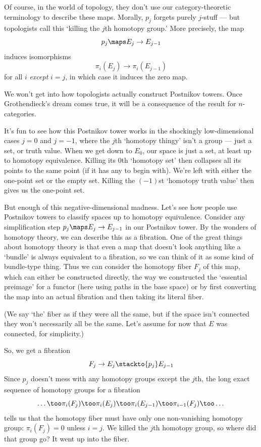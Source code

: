 \documentclass[12pt]{amsart}
\begin{document}
Of course, in the world of topology, they don't use our category-theoretic 
terminology to describe these maps.  Morally, $p_j$
forgets purely $j$-stuff --- but topologists call this `killing the
$j$th homotopy group.'  More precisely, the map
\[p_j \maps E_j \to E_{j-1}\]
induces isomorphisms
\[\pi_i(E_j)\to \pi_i(E_{j-1})\]
for all $i$ \emph{except} $i=j$, in which case it induces the zero map.

We won't get into how topologists actually
construct Postnikov towers.  Once Grothendieck's dream
comes true, it will be a consequence of the result for 
$n$-categories.

It's fun to see how this Postnikov tower works in the shockingly 
low-dimensional cases $j = 0$ and $j = -1$, where the $j$th 
`homotopy thingy' isn't a group --- just a set, or truth value.  
When we get down to $E_0$, our space is just a set, at least
up to homotopy equivalence.  Killing its $0$th `homotopy set' then 
collapses all its points to the same point (if it has any to begin with).  
We're left with either the one-point set or the empty set.
Killing the $(-1)$st `homotopy truth value' then gives us the
one-point set.

But enough of this negative-dimensional madness.  Let's see how
people use Postnikov towers to classify spaces up to homotopy
equivalence.  Consider any simplification step $p_j\maps E_j\to E_{j-1}$ 
in our Postnikov tower.  By
the wonders of homotopy theory, we can describe this as a fibration.
One of the great things about homotopy theory is that even a map
that doesn't look anything like a `bundle' is always 
equivalent to a fibration, so we can think of it as some kind of
bundle-type thing.  Thus we can consider the homotopy fiber
$F_j$ of this map, which can either be constructed directly, the way
we constructed the `essential preimage' for a functor (here using
paths in the base space) or by first converting the map into an actual
fibration and then taking its literal fiber.

(We say `the' fiber as if they were all the same, but if the space
isn't connected they won't necessarily all be the same.  Let's assume
for now that $E$ was connected, for simplicity.)

So, we get a fibration
\[            F_j \to E_j \stackto{p_j} E_{j-1}  \]
Since $p_j$ doesn't mess with any homotopy groups except the $j$th,
the long exact sequence of homotopy groups for a fibration
\[ \dots\too \pi_i(F_j) \too \pi_i(E_j) \too \pi_i(E_{j-1}) 
\too \pi_{i-1}(F_j)\too\dots\]
tells us that the homotopy fiber must have only one non-vanishing
homotopy group: $\pi_i(F_j)=0$ unless $i=j$.  We killed the $j$th
homotopy group, so where did that group go?  It went up into the fiber.
\end{document}
